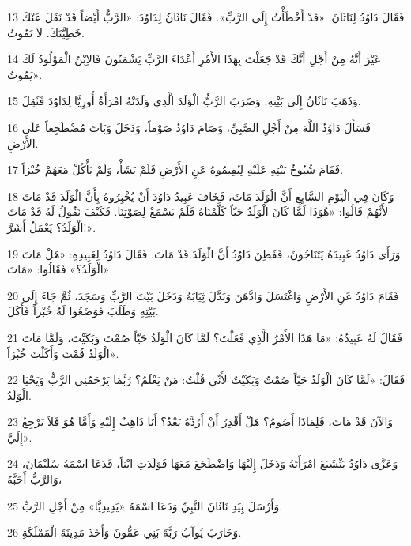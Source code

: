 \par 13 فَقَالَ دَاوُدُ لِنَاثَانَ: «قَدْ أَخْطَأْتُ إِلَى الرَّبِّ». فَقَالَ نَاثَانُ لِدَاوُدَ: «الرَّبُّ أَيْضاً قَدْ نَقَلَ عَنْكَ خَطِيَّتَكَ. لاَ تَمُوتُ.
\par 14 غَيْرَ أَنَّهُ مِنْ أَجْلِ أَنَّكَ قَدْ جَعَلْتَ بِهَذَا الأَمْرِ أَعْدَاءَ الرَّبِّ يَشْمَتُونَ فَالاِبْنُ الْمَوْلُودُ لَكَ يَمُوتُ».
\par 15 وَذَهَبَ نَاثَانُ إِلَى بَيْتِهِ. وَضَرَبَ الرَّبُّ الْوَلَدَ الَّذِي وَلَدَتْهُ امْرَأَةُ أُورِيَّا لِدَاوُدَ فَثَقِلَ.
\par 16 فَسَأَلَ دَاوُدُ اللَّهَ مِنْ أَجْلِ الصَّبِيِّ، وَصَامَ دَاوُدُ صَوْماً، وَدَخَلَ وَبَاتَ مُضْطَجِعاً عَلَى الأَرْضِ.
\par 17 فَقَامَ شُيُوخُ بَيْتِهِ عَلَيْهِ لِيُقِيمُوهُ عَنِ الأَرْضِ فَلَمْ يَشَأْ، وَلَمْ يَأْكُلْ مَعَهُمْ خُبْزاً.
\par 18 وَكَانَ فِي الْيَوْمِ السَّابِعِ أَنَّ الْوَلَدَ مَاتَ، فَخَافَ عَبِيدُ دَاوُدَ أَنْ يُخْبِرُوهُ بِأَنَّ الْوَلَدَ قَدْ مَاتَ لأَنَّهُمْ قَالُوا: «هُوَذَا لَمَّا كَانَ الْوَلَدُ حَيّاً كَلَّمْنَاهُ فَلَمْ يَسْمَعْ لِصَوْتِنَا. فَكَيْفَ نَقُولُ لَهُ قَدْ مَاتَ الْوَلَدُ؟ يَعْمَلُ أَشَرَّ!».
\par 19 وَرَأَى دَاوُدُ عَبِيدَهُ يَتَنَاجُونَ، فَفَطِنَ دَاوُدُ أَنَّ الْوَلَدَ قَدْ مَاتَ. فَقَالَ دَاوُدُ لِعَبِيدِهِ: «هَلْ مَاتَ الْوَلَدُ؟» فَقَالُوا: «مَاتَ».
\par 20 فَقَامَ دَاوُدُ عَنِ الأَرْضِ وَاغْتَسَلَ وَادَّهَنَ وَبَدَّلَ ثِيَابَهُ وَدَخَلَ بَيْتَ الرَّبِّ وَسَجَدَ، ثُمَّ جَاءَ إِلَى بَيْتِهِ وَطَلَبَ فَوَضَعُوا لَهُ خُبْزاً فَأَكَلَ.
\par 21 فَقَالَ لَهُ عَبِيدُهُ: «مَا هَذَا الأَمْرُ الَّذِي فَعَلْتَ؟ لَمَّا كَانَ الْوَلَدُ حَيّاً صُمْتَ وَبَكَيْتَ، وَلَمَّا مَاتَ الْوَلَدُ قُمْتَ وَأَكَلْتَ خُبْزاً».
\par 22 فَقَالَ: «لَمَّا كَانَ الْوَلَدُ حَيّاً صُمْتُ وَبَكَيْتُ لأَنِّي قُلْتُ: مَنْ يَعْلَمُ؟ رُبَّمَا يَرْحَمُنِي الرَّبُّ وَيَحْيَا الْوَلَدُ.
\par 23 وَالآنَ قَدْ مَاتَ، فَلِمَاذَا أَصُومُ؟ هَلْ أَقْدِرُ أَنْ أَرُدَّهُ بَعْدُ؟ أَنَا ذَاهِبٌ إِلَيْهِ وَأَمَّا هُوَ فَلاَ يَرْجِعُ إِلَيَّ».
\par 24 وَعَزَّى دَاوُدُ بَثْشَبَعَ امْرَأَتَهُ وَدَخَلَ إِلَيْهَا وَاضْطَجَعَ مَعَهَا فَوَلَدَتِ ابْناً، فَدَعَا اسْمَهُ سُلَيْمَانَ، وَالرَّبُّ أَحَبَّهُ،
\par 25 وَأَرْسَلَ بِيَدِ نَاثَانَ النَّبِيِّ وَدَعَا اسْمَهُ «يَدِيدِيَّا» مِنْ أَجْلِ الرَّبِّ.
\par 26 وَحَارَبَ يُوآبُ رَبَّةَ بَنِي عَمُّونَ وَأَخَذَ مَدِينَةَ الْمَمْلَكَةِ.
